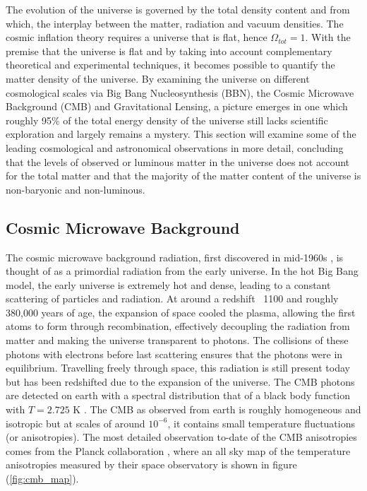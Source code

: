 The evolution of the universe is governed by the total density content and from which, the interplay between the matter, radiation and vacuum densities. The cosmic inflation theory requires a universe that is flat, hence $\Omega_{tot} = 1$. With the premise that the universe is flat and by taking into account complementary theoretical and experimental techniques, it becomes possible to quantify the matter density of the universe. By examining the universe on  different cosmological scales via Big Bang Nucleosynthesis (BBN), the Cosmic Microwave Background (CMB) and Gravitational Lensing, a picture emerges in one which roughly 95\% of the total energy density of the universe still lacks scientific exploration and largely remains a mystery. This section will examine some of the leading cosmological and astronomical observations in more detail, concluding that the levels of observed or luminous matter in the universe does not account for the total matter and that the majority of the matter content of the universe is non-baryonic and non-luminous. 

\subsection{Cosmic Microwave Background}
\label{subsec:CMB}

The cosmic microwave background radiation, first discovered in mid-1960s \cite{CMB_disc}, is thought of as a primordial radiation from the early universe. In the hot Big Bang model, the early universe is extremely hot and dense, leading to a constant scattering of particles and radiation. At around a redshift ~1100 and roughly 380,000 years of age, the expansion of space cooled the plasma, allowing the first atoms to form through recombination, effectively decoupling the radiation from matter and making the universe transparent to photons. The collisions of these photons with electrons before last scattering ensures that the photons were in equilibrium. Travelling freely through space, this radiation is still present today but has been redshifted due to the expansion of the universe. The CMB photons are detected on earth with a spectral distribution that of a black body function with $T = 2.725$ K \cite{cmb_temp}. The CMB as observed from earth is roughly homogeneous and isotropic but at scales of around $10^{-6}$, it contains small temperature fluctuations (or anisotropies). The most detailed observation to-date of the CMB anisotropies comes from the Planck collaboration \cite{plank_cmb_map}, where an all sky map of the temperature anisotropies measured by their space observatory is shown in figure (\ref{fig:cmb_map}).

